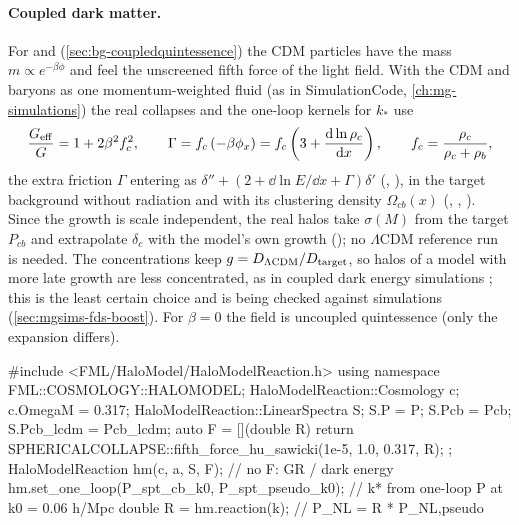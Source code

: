 \paragraph*{Coupled dark matter.} For  and 
(\cref{sec:bg-coupledquintessence}) the CDM particles have the mass $m\propto e^{-\beta\phi}$ and feel the unscreened fifth force of the
light field. With the CDM and baryons as one momentum-weighted fluid (as in SimulationCode, \cref{ch:mg-simulations}) the real
collapses and the one-loop kernels for $k_*$ use
\begin{equation}
\frac{G_{\rm eff}}{G}=1+2\beta^2f_c^2,\qquad \Gamma=f_c\,(-\beta\phi_x)=f_c\left(3+\frac{\mathrm{d}\ln\rho_c}{\mathrm{d} x}\right),\qquad
f_c=\frac{\rho_c}{\rho_c+\rho_b},
\end{equation}
the extra friction $\Gamma$ entering as $\delta''+(2+\dd\ln E/\dd x+\Gamma)\delta'$ (,
), in the target background without radiation and with its clustering density
$\Omega_{cb}(x)$ (, , ). Since the growth is
scale independent, the real halos take $\sigma(M)$ from the target $P_{cb}$ and extrapolate $\delta_c$ with the model's own
growth (); no $\Lambda$CDM reference run is needed. The concentrations keep $g=D_{\Lambda\rm
CDM}/D_{\rm target}$, so halos of a model with more late growth are less concentrated, as in coupled dark energy
simulations \cite{Baldi2010}; this is the least certain choice and is being checked against simulations
(\cref{sec:mgsims-fds-boost}). For $\beta=0$ the field is uncoupled quintessence (only the expansion differs).

\begin{cppcode}
#include <FML/HaloModel/HaloModelReaction.h>
using namespace FML::COSMOLOGY::HALOMODEL;
HaloModelReaction::Cosmology c;  c.OmegaM = 0.317;
HaloModelReaction::LinearSpectra S;  S.P = P;  S.Pcb = Pcb;  S.Pcb_lcdm = Pcb_lcdm;
auto F = [](double R) { return SPHERICALCOLLAPSE::fifth_force_hu_sawicki(1e-5, 1.0, 0.317, R); };
HaloModelReaction hm(c, a, S, F);              // no F: GR / dark energy
hm.set_one_loop(P_spt_cb_k0, P_spt_pseudo_k0); // k* from one-loop P at k0 = 0.06 h/Mpc
double R = hm.reaction(k);                     // P_NL = R * P_NL,pseudo
\end{cppcode}

